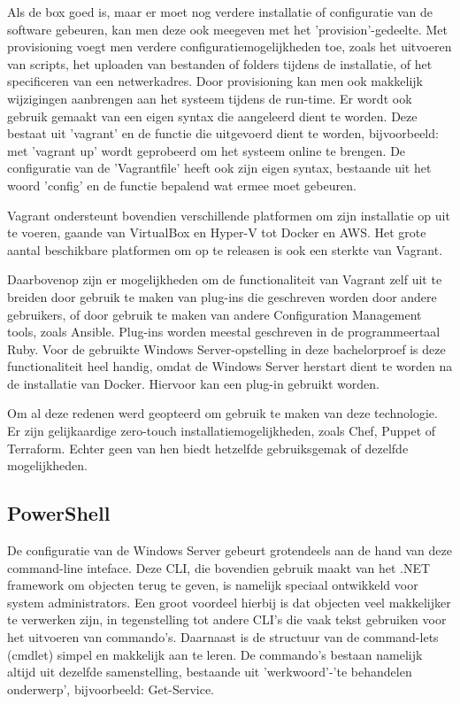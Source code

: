 Als de box goed is, maar er moet nog verdere installatie of configuratie van de software gebeuren, kan men deze ook meegeven met het 'provision'-gedeelte. Met provisioning voegt men verdere configuratiemogelijkheden toe, zoals het uitvoeren van scripts, het uploaden van bestanden of folders tijdens de installatie, of het specificeren van een netwerkadres. Door provisioning kan men ook makkelijk wijzigingen aanbrengen aan het systeem tijdens de run-time. Er wordt ook gebruik gemaakt van een eigen syntax die aangeleerd dient te worden. Deze bestaat uit 'vagrant' en de functie die uitgevoerd dient te worden, bijvoorbeeld: met 'vagrant up' wordt geprobeerd om het systeem online te brengen. De configuratie van de 'Vagrantfile' heeft ook zijn eigen syntax, bestaande uit het woord ’config’ en de functie bepalend wat ermee moet gebeuren.

Vagrant ondersteunt bovendien verschillende platformen om zijn installatie op uit te voeren, gaande van VirtualBox en Hyper-V tot Docker en AWS. Het grote aantal beschikbare platformen om op te releasen is ook een sterkte van Vagrant.

Daarbovenop zijn er mogelijkheden om de functionaliteit van Vagrant zelf uit te breiden door gebruik te maken van plug-ins die geschreven worden door andere gebruikers, of door gebruik te maken van andere Configuration Management tools, zoals Ansible. Plug-ins worden meestal geschreven in de programmeertaal Ruby. Voor de gebruikte Windows Server-opstelling in deze bachelorproef is deze functionaliteit heel handig, omdat de Windows Server herstart dient te worden na de installatie van Docker. Hiervoor kan een plug-in gebruikt worden.

Om al deze redenen werd geopteerd om gebruik te maken van deze technologie. Er zijn gelijkaardige zero-touch installatiemogelijkheden, zoals Chef, Puppet of Terraform. Echter geen van hen biedt hetzelfde gebruiksgemak of dezelfde mogelijkheden.

\subsection{PowerShell}
De configuratie van de Windows Server gebeurt grotendeels aan de hand van deze command-line inteface. Deze CLI, die bovendien gebruik maakt van het .NET framework om objecten terug te geven, is namelijk speciaal ontwikkeld voor system administrators. Een groot voordeel hierbij is dat objecten veel makkelijker te verwerken zijn, in tegenstelling tot andere CLI’s die vaak tekst gebruiken voor het uitvoeren van commando’s. Daarnaast is de structuur van de command-lets (cmdlet) simpel en makkelijk aan te leren. De commando’s bestaan namelijk altijd uit dezelfde samenstelling, bestaande uit 'werkwoord'-'te behandelen onderwerp', bijvoorbeeld: Get-Service.

